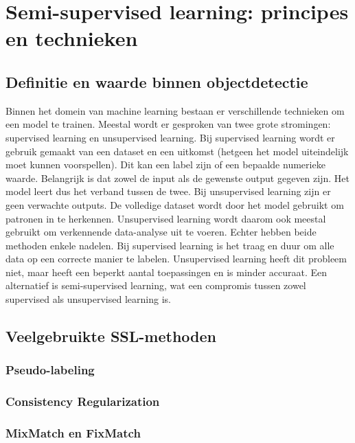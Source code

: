 \section{Semi-supervised learning: principes en technieken}

\subsection{Definitie en waarde binnen objectdetectie}

Binnen het domein van machine learning bestaan er verschillende technieken om een model te trainen. Meestal wordt er gesproken van twee grote stromingen: supervised learning en unsupervised learning. Bij supervised learning wordt er gebruik gemaakt van een dataset en een uitkomst (hetgeen het model uiteindelijk moet kunnen voorspellen). Dit kan een label zijn of een bepaalde numerieke waarde. Belangrijk is dat zowel de input als de gewenste output gegeven zijn. Het model leert dus het verband tussen de twee. Bij unsupervised learning zijn er geen verwachte outputs. De volledige dataset wordt door het model gebruikt om patronen in te herkennen. Unsupervised learning wordt daarom ook meestal gebruikt om verkennende data-analyse uit te voeren. Echter hebben beide methoden enkele nadelen. Bij supervised learning is het traag en duur om alle data op een correcte manier te labelen. Unsupervised learning heeft dit probleem niet, maar heeft een beperkt aantal toepassingen en is minder accuraat. Een alternatief is semi-supervised learning, wat een compromis tussen zowel supervised als unsupervised learning is. \autocite{C_A_Padmanabha_Reddy_2018} \\

\subsection{Veelgebruikte SSL-methoden}

\subsubsection{Pseudo-labeling}

\subsubsection{Consistency Regularization}

\subsubsection{MixMatch en FixMatch}